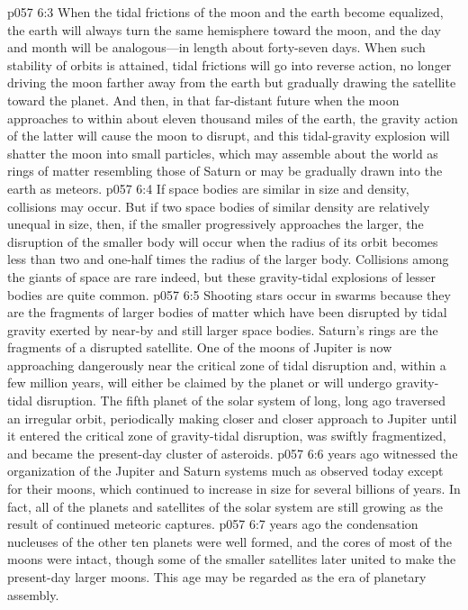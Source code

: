 \vs p057 6:3 When the tidal frictions of the moon and the earth become equalized, the earth will always turn the same hemisphere toward the moon, and the day and month will be analogous---in length about forty\hyp{}seven days. When such stability of orbits is attained, tidal frictions will go into reverse action, no longer driving the moon farther away from the earth but gradually drawing the satellite toward the planet. And then, in that far\hyp{}distant future when the moon approaches to within about eleven thousand miles of the earth, the gravity action of the latter will cause the moon to disrupt, and this tidal\hyp{}gravity explosion will shatter the moon into small particles, which may assemble about the world as rings of matter resembling those of Saturn or may be gradually drawn into the earth as meteors.\plusone
\vs p057 6:4 If space bodies are similar in size and density, collisions may occur. But if two space bodies of similar density are relatively unequal in size, then, if the smaller progressively approaches the larger, the disruption of the smaller body will occur when the radius of its orbit becomes less than two and one\hyp{}half times the radius of the larger body. Collisions among the giants of space are rare indeed, but these gravity\hyp{}tidal explosions of lesser bodies are quite common.\plusone
\vs p057 6:5 Shooting stars occur in swarms because they are the fragments of larger bodies of matter which have been disrupted by tidal gravity exerted by near\hyp{}by and still larger space bodies. Saturn’s rings are the fragments of a disrupted satellite. One of the moons of Jupiter is now approaching dangerously near the critical zone of tidal disruption and, within a few million years, will either be claimed by the planet or will undergo gravity\hyp{}tidal disruption. The fifth planet of the solar system of long, long ago traversed an irregular orbit, periodically making closer and closer approach to Jupiter until it entered the critical zone of gravity\hyp{}tidal disruption, was swiftly fragmentized, and became the present\hyp{}day cluster of asteroids.
\pc \vs p057 6:6  years ago witnessed the organization of the Jupiter and Saturn systems much as observed today except for their moons, which continued to increase in size for several billions of years. In fact, all of the planets and satellites of the solar system are still growing as the result of continued meteoric captures.
\pc \vs p057 6:7  years ago the condensation nucleuses of the other ten planets were well formed, and the cores of most of the moons were intact, though some of the smaller satellites later united to make the present\hyp{}day larger moons. This age may be regarded as the era of planetary assembly.
